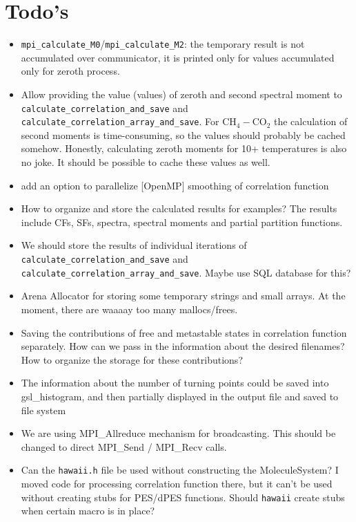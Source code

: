 \documentclass{article}
\begin{document}
\section{Todo's}

\begin{itemize}
    \item \texttt{mpi\_calculate\_M0}/\texttt{mpi\_calculate\_M2}: the temporary result is not accumulated over communicator, it is printed only for values accumulated only for zeroth process.
    \item Allow providing the value (values) of zeroth and second spectral moment to \texttt{calculate\_correlation\_and\_save} and \texttt{calculate\_correlation\_array\_and\_save}. {\color{red} For CH$_4-$CO$_2$ the calculation of second moments is time-consuming, so the values should probably be cached somehow. Honestly, calculating zeroth moments for 10+ temperatures is also no joke. It should be possible to cache these values as well.}
    \item add an option to parallelize [OpenMP] smoothing of correlation function 
    \item How to organize and store the calculated results for examples? The results include CFs, SFs, spectra, spectral moments and partial partition functions.
    \item We should store the results of individual iterations of \texttt{calculate\_correlation\_and\_save} and \texttt{calculate\_correlation\_array\_and\_save}. Maybe use SQL database for this?
    \item Arena Allocator for storing some temporary strings and small arrays. At the moment, there are waaaay too many mallocs/frees. 
    \item Saving the contributions of free and metastable states in correlation function separately. How can we pass in the information about the desired filenames? How to organize the storage for these contributions? 
    \item The information about the number of turning points could be saved into gsl\_histogram, and then partially displayed in the output file and saved to file system
    \item We are using MPI\_Allreduce mechanism for broadcasting. This should be changed to direct MPI\_Send / MPI\_Recv calls.
    \item Can the \texttt{hawaii.h} file be used without constructing the MoleculeSystem? I moved code for processing correlation function there, but it can't be used without creating stubs for PES/dPES functions. Should \texttt{hawaii} create stubs when certain macro is in place? 

\end{itemize}
\end{document}
